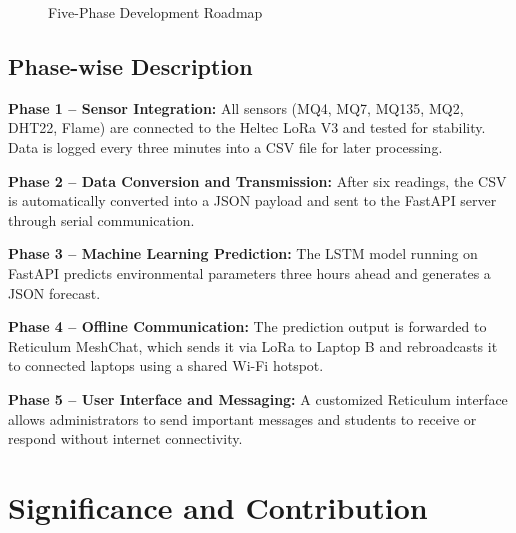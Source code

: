 \begin{figure}[H]
\caption{Five-Phase Development Roadmap }
\label{fig:project_timeline_updated}
\end{figure}



\subsection{Phase-wise Description}

\textbf{Phase 1 – Sensor Integration:}
All sensors (MQ4, MQ7, MQ135, MQ2, DHT22, Flame) are connected to the Heltec LoRa V3 and tested for stability. Data is logged every three minutes into a CSV file for later processing.

\textbf{Phase 2 – Data Conversion and Transmission:}
After six readings, the CSV is automatically converted into a JSON payload and sent to the FastAPI server through serial communication.

\textbf{Phase 3 – Machine Learning Prediction:}
The LSTM model running on FastAPI predicts environmental parameters three hours ahead and generates a JSON forecast.

\textbf{Phase 4 – Offline Communication:}
The prediction output is forwarded to Reticulum MeshChat, which sends it via LoRa to Laptop B and rebroadcasts it to connected laptops using a shared Wi-Fi hotspot.

\textbf{Phase 5 – User Interface and Messaging:}
A customized Reticulum interface allows administrators to send important messages and students to receive or respond without internet connectivity.
\section{Significance and Contribution}

